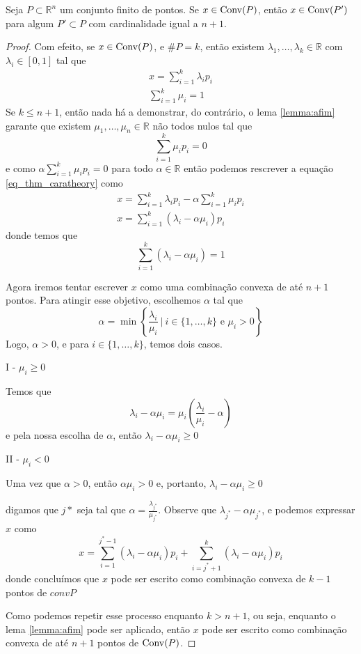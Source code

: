 \begin{thm:caratheodory}[Carathéodory]
	Seja $P \subset \mathbb{R}^n$ um conjunto finito de pontos. Se $x \in \mathrm{Conv}(P)$, então
	$x \in \mathrm{Conv}(P')$ para algum $P' \subset P$ com cardinalidade igual a $n + 1$.
	
	\begin{proof}
		Com efeito, se $x \in \mathrm{Conv}(P)$, e $\#P = k$, então existem $\lambda_1, \ldots, \lambda_k 
		\in \mathbb{R}$ com $\lambda_i \in [0, 1]$ tal que
		\begin{equation}
		\label{eq_thm_caratheory}
		\begin{gathered}
			x = \displaystyle\sum_{i=1}^k \lambda_i p_i \\
			\displaystyle\sum_{i=1}^k \mu_i = 1
		\end{gathered}
		\end{equation}
		Se $k \leq n + 1$, então nada há a demonstrar, do contrário, o lema \ref{lemma:afim}
		garante que existem $\mu_1, \ldots, \mu_n \in \mathbb{R}$ não todos nulos tal que
		\[\displaystyle\sum_{i=1}^k \mu_i p_i = 0\]
		e como \(\alpha \displaystyle\sum_{i=1}^k \mu_i p_i = 0\) para todo $\alpha \in \mathbb{R}$
		então podemos rescrever a equação \ref{eq_thm_caratheory} como
		\begin{gather*}
			x = \displaystyle\sum_{i=1}^k \lambda_i p_i - \alpha \displaystyle\sum_{i=1}^k \mu_i p_i \\
			x = \displaystyle\sum_{i=1}^k (\lambda_i - \alpha \mu_i) p_i
		\end{gather*}
		donde temos que
		\[\displaystyle\sum_{i=1}^k (\lambda_i - \alpha \mu_i) = 1\]
		
		Agora iremos tentar escrever $x$ como uma combinação convexa de até $n + 1$ pontos.
		Para atingir esse objetivo, escolhemos $\alpha$ tal que
		\[\alpha  = \min\left\{\frac{\lambda_i}{\mu_i}\  |\  i \in \{1,\ldots, k\} \text{ e } \mu_i > 0\right\}\]
		Logo, $\alpha > 0$, e para $i \in \{1, \ldots, k\}$, temos dois casos.
		
		I - $\mu_i \geq 0$
		
		Temos que
		\[\lambda_i - \alpha \mu_i = \mu_i \left(\frac{\lambda_i}{\mu_i} - \alpha\right)\]
		e pela nossa escolha de $\alpha$, então \(\lambda_i - \alpha \mu_i \geq 0\)
		
		II - $\mu_i < 0$
		
		Uma vez que $\alpha > 0$, então $\alpha \mu_i > 0$ e, portanto,
		\(\lambda_i - \alpha \mu_i \geq 0\)
		
		digamos que $j*$ seja tal que $\alpha = \frac{\lambda_{j^*}}{\mu_{j^*}}$. Observe que
		$\lambda_{j^*} - \alpha \mu_{j^*}$, e podemos expressar $x$ como
		\[x = \displaystyle\sum_{i=1}^{j^* - 1} (\lambda_i - \alpha \mu_i)p_i + 
				\displaystyle\sum_{i=j^* + 1}^{k} (\lambda_i - \alpha \mu_i)p_i\]
		donde concluímos que $x$ pode ser escrito como combinação convexa de $k - 1$ pontos de $conv{P}$
		
		Como podemos repetir esse processo enquanto $k > n + 1$, ou seja, enquanto o lema \ref{lemma:afim}
		pode ser aplicado, então $x$ pode ser escrito como combinação convexa de até $n + 1$ pontos de $\mathrm{Conv}(P)$.
	\end{proof}
\end{thm:caratheodory}

